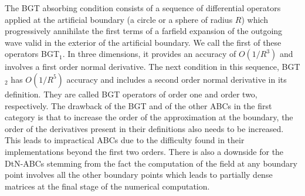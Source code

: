 \documentclass[final,3p,times,12pt]{elsarticle}
\begin{document}
The BGT absorbing condition consists of a sequence of differential operators applied at the artificial boundary (a circle or a sphere of radius $R$) which progressively annihilate the first terms of a farfield expansion of the outgoing wave valid in the exterior of the artificial boundary. We call the first of these operators BGT$_1$. In three dimensions, it provides an accuracy of $O(1/R^{3})$ and involves a first order normal derivative. The next condition in this sequence, BGT$_2$ has  $O(1/R^{5})$ accuracy and includes a second order normal derivative in its definition. They are called BGT operators of order one and order two, respectively.
The drawback of the BGT and of the other ABCs in the first category is that to increase the order of the approximation at the boundary, the order of the derivatives present in their definitions also needs  to be increased. This leads to  impractical ABCs due to the difficulty found in their implementations beyond the first two orders. There is also a downside for the DtN-ABCs stemming from the fact the computation of the field at any boundary point involves all the other boundary points which leads to partially dense matrices at the final stage of the numerical computation.  
\end{document}
